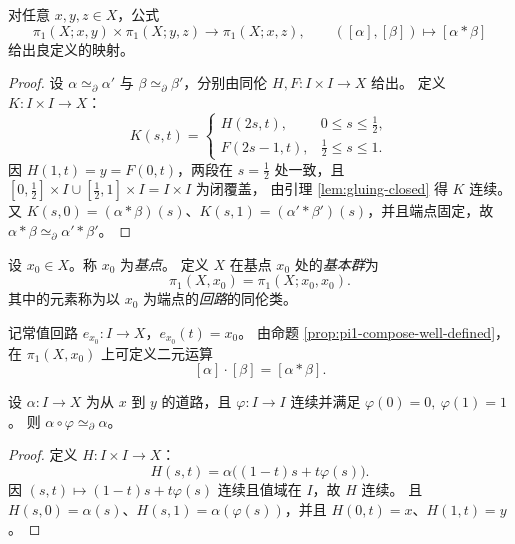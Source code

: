 \documentclass[lang=cn,a4paper,newtx,figureplace=section,tableplace=section]{elegantbook}
\begin{document}
\begin{proposition}\label{prop:pi1-compose-well-defined}
  对任意 $x,y,z\in X$，公式
  \[
    \pi_1(X;x,y)\times\pi_1(X;y,z)\to\pi_1(X;x,z),\qquad ([\alpha],[\beta])\mapsto[\alpha\ast\beta]
  \]
  给出良定义的映射。
\end{proposition}
\begin{proof}
  设 $\alpha\simeq_{\partial}\alpha'$ 与 $\beta\simeq_{\partial}\beta'$，分别由同伦 $H,F:I\times I\to X$ 给出。
  定义 $K:I\times I\to X$：
  \[
    K(s,t)=\begin{cases}
      H(2s,t), & 0\le s\le\tfrac12,\\
      F(2s-1,t), & \tfrac12\le s\le 1.
    \end{cases}
  \]
  因 $H(1,t)=y=F(0,t)$，两段在 $s=\tfrac12$ 处一致，且 $[0,\tfrac12]\times I\cup [\tfrac12,1]\times I=I\times I$ 为闭覆盖，
  由引理 \ref{lem:gluing-closed} 得 $K$ 连续。
  又 $K(s,0)=(\alpha\ast\beta)(s)$、$K(s,1)=(\alpha'\ast\beta')(s)$，并且端点固定，故 $\alpha\ast\beta\simeq_{\partial}\alpha'\ast\beta'$。
\end{proof}

\begin{definition}[基本群]\label{def:fundamental-group}
  设 $x_0\in X$。称 $x_0$ 为\emph{基点}。
  定义 $X$ 在基点 $x_0$ 处的\emph{基本群}为
  \[
    \pi_1(X,x_0)=\pi_1(X;x_0,x_0).
  \]
  其中的元素称为以 $x_0$ 为端点的\emph{回路}的同伦类。
\end{definition}

\begin{definition}\label{def:fundamental-group-operation}
  记常值回路 $e_{x_0}:I\to X$，$e_{x_0}(t)=x_0$。
  由命题 \ref{prop:pi1-compose-well-defined}，在 $\pi_1(X,x_0)$ 上可定义二元运算
  \[
    [\alpha]\cdot[\beta]=[\alpha\ast\beta].
  \]
\end{definition}

\begin{lemma}\label{lem:path-reparam-homotopy}
  设 $\alpha:I\to X$ 为从 $x$ 到 $y$ 的道路，且 $\varphi:I\to I$ 连续并满足 $\varphi(0)=0,\ \varphi(1)=1$。
  则 $\alpha\circ\varphi\simeq_{\partial}\alpha$。
\end{lemma}
\begin{proof}
  定义 $H:I\times I\to X$：
  \[
    H(s,t)=\alpha\big((1-t)s+t\varphi(s)\big).
  \]
  因 $(s,t)\mapsto (1-t)s+t\varphi(s)$ 连续且值域在 $I$，故 $H$ 连续。
  且 $H(s,0)=\alpha(s)$、$H(s,1)=\alpha(\varphi(s))$，并且 $H(0,t)=x$、$H(1,t)=y$。
\end{proof}
\end{document}
